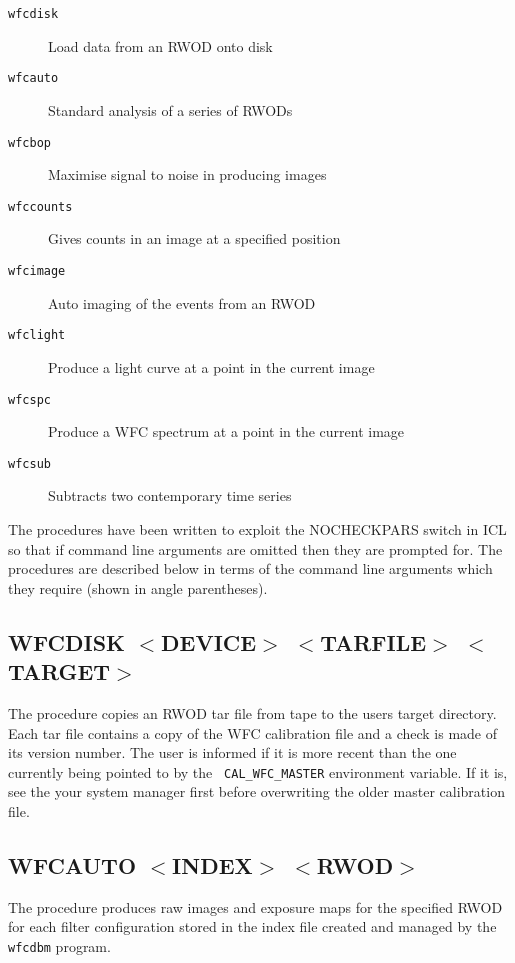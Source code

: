 \begin{description}
\begin{description}
\item [{\tt wfcdisk}]   Load data from an RWOD onto disk
\item [{\tt wfcauto} ]  Standard analysis of a series of RWODs
\item [{\tt wfcbop}]    Maximise signal to noise in producing images
\item [{\tt wfccounts}] Gives counts in an image at a specified position
\item [{\tt wfcimage}]  Auto imaging of the events from an RWOD
\item [{\tt wfclight}]  Produce a light curve at a point in the current image
\item [{\tt wfcspc}]    Produce a WFC spectrum at a point in the current image
\item [{\tt wfcsub}]    Subtracts two contemporary time series
\end{description}
\end{description}

The procedures have been written to exploit the NOCHECKPARS switch in
ICL so that if command line arguments are omitted then they are
prompted for.  The procedures are described below in terms of the
command line arguments which they require (shown in angle
parentheses).

\subsection{WFCDISK $<$DEVICE$>$ $<$TARFILE$>$ $<$TARGET$>$}
\label{sec:procedures:wfcdisk}

The procedure copies an RWOD tar file from tape to the users target
directory.  Each tar file contains a copy of the WFC calibration file
and a check is made of its version number.  The user is informed if it
is more recent than the one currently being pointed to by the {\tt
CAL\_WFC\_MASTER} environment variable.  If it is, see the your system
manager first before overwriting the older master calibration file.

\subsection{WFCAUTO $<$INDEX$>$ $<$RWOD$>$}
\label{sec:procedures:wfcauto}

The procedure produces raw images and exposure maps for the specified
RWOD for each filter configuration stored in the index file
created and managed by the {\tt wfcdbm} program.


